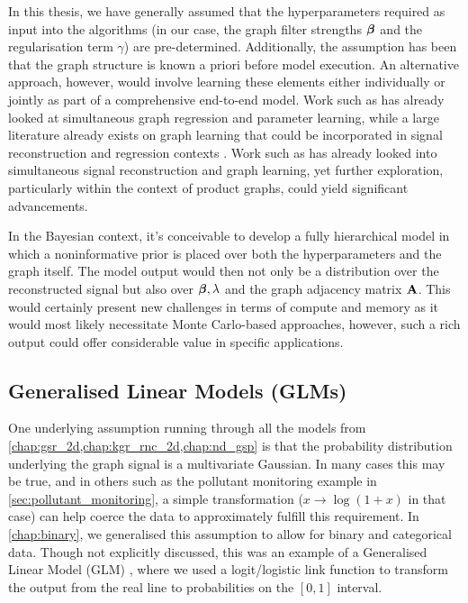 In this thesis, we have generally assumed that the hyperparameters required as input into the algorithms (in our case, the graph filter strengths $\boldsymbol{\beta}$ and the regularisation term $\gamma$) are pre-determined. Additionally, the assumption has been that the graph structure is known a priori before model execution. An alternative approach, however, would involve learning these elements either individually or jointly as part of a comprehensive end-to-end model. Work such as \cite{Zhi2023} has already looked at simultaneous graph regression and parameter learning, while a large literature already exists on graph learning that could be incorporated in signal reconstruction and regression contexts \citep{Dong2019}. Work such as \cite{Hu2015} has already looked into simultaneous signal reconstruction and graph learning, yet further exploration, particularly within the context of product graphs, could yield significant advancements.

In the Bayesian context, it's conceivable to develop a fully hierarchical model in which a noninformative prior is placed over both the hyperparameters and the graph itself. The model output would then not only be a distribution over the reconstructed signal but also over $\boldsymbol{\beta}, \lambda$ and the graph adjacency matrix $\mathbf{A}$. This would certainly present new challenges in terms of compute and memory as it would most likely necessitate Monte Carlo-based approaches, however, such a rich output could offer considerable value in specific applications.


\subsection{Generalised Linear Models (GLMs)}

One underlying assumption running through all the models from \cref{chap:gsr_2d,chap:kgr_rnc_2d,chap:nd_gsp}  is that the probability distribution underlying the graph signal is a multivariate Gaussian. In many cases this may be true, and in others such as the pollutant monitoring example in \cref{sec:pollutant_monitoring}, a simple transformation ($x \rightarrow \log( 1 + x)$ in that case) can help coerce the data to approximately fulfill this requirement. In \cref{chap:binary}, we generalised this assumption to allow for binary and categorical data. Though not explicitly discussed, this was an example of a Generalised Linear Model (GLM) \citep{Nelder1972}, where we used a logit/logistic link function to transform the output from the real line to probabilities on the $[0, 1]$ interval. 

